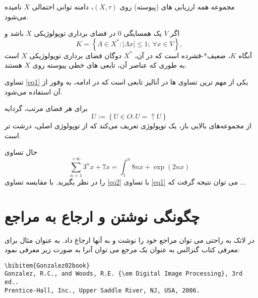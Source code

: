 %
%
%

\begin{definition}
مجموعه همه ارزیابی های  (پیوسته)  روی $(X,\tau)$، دامنه توانی احتمالی
$ X $
نامیده می‌شود.
\end{definition}
\begin{theorem}
اگر $ V $ یک همسایگی $ 0 $ در فضای برداری 
 توپولوژیکی $ X $ باشد و 
\begin{equation}\label{eq1}
K=\left\lbrace \Lambda \in X^{*}:|\Lambda x|\leqslant 1 ; \ \forall x\in V\right\rbrace,
\end{equation}
آنگاه $ K $،  ضعیف*-فشرده است که در آن، $ X^{*} $ دوگان
 فضای برداری توپولوژیکی $ X $ است به  طوری که عناصر آن،  تابعی های 
خطی پیوسته
 روی $X$ هستند.
\end{theorem}
تساوی \eqref{eq1} یکی از مهم ترین تساوی ها در آنالیز تابعی است که در ادامه، به وفور از آن استفاده می‌شود.
\begin{example}
برای هر فضای مرتب، گردایه 
$$U:=\left\lbrace U\in O: U=\uparrow U\right\rbrace $$
از مجموعه‌های بالایی باز، یک توپولوژی تعریف می‌کند که از توپولوژی اصلی، درشت تر  است.
\end{example}
حال تساوی 
\begin{equation}\label{eq2}
\sum_{n=1}^{+\infty} 3^{n}x+7x=\int_{1}^{n}8nx+\exp{(2nx)}
\end{equation}
را در نظر بگیرید. با مقایسه تساوی \eqref{eq2} با تساوی \eqref{eq1} می توان نتیجه گرفت که ...


\section{چگونگی نوشتن و ارجاع به مراجع}\label{Sec:Ref}

در لاتک به راحتی می توان مراجع خود را نوشت و به آنها ارجاع داد. به عنوان مثال برای معرفی کتاب گنزالس \cite{Gonzalez02book} به عنوان یک مرجع می توان آنرا به صورت زیر معرفی نمود:

\singlespacing
\begin{LTR}
\begin{verbatim}
\bibitem{Gonzalez02book}
Gonzalez, R.C., and Woods, R.E. {\em Digital Image Processing}, 3rd ed..
Prentice-Hall, Inc., Upper Saddle River, NJ, USA, 2006.
\end{verbatim}
\end{LTR}
\doublespacing

